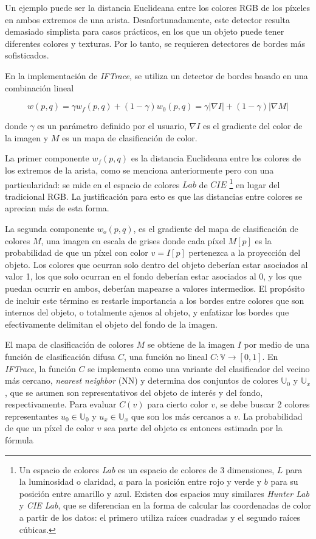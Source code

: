Un ejemplo puede ser la distancia Euclideana entre los colores RGB de los píxeles
en ambos extremos de una arista. Desafortunadamente, este detector resulta demasiado
simplista para casos prácticos, en los que un objeto puede tener diferentes colores y
texturas. Por lo tanto, se requieren detectores de bordes más sofisticados.

En la implementación de \textit{IFTrace}, se utiliza un detector de bordes basado en
una combinación lineal

\begin{equation}
   \label{eq:IFTrace-edge-detector}
   w(p,q) = \gamma w_{f}(p,q) + (1 - \gamma)w_{0}(p,q) = \gamma |\nabla I| + (1 - \gamma)|\nabla M|
\end{equation}

donde $\gamma$ es un parámetro definido por el usuario, $\nabla I$ es el gradiente
del color de la imagen y $M$ es un mapa de clasificación de color.

La primer componente $w_{f}(p,q)$ es la distancia Euclideana entre los colores
de los extremos de la arista, como se menciona anteriormente pero con una
particularidad: se mide en el espacio de colores $Lab$ de $CIE$ \footnote{ Un
  espacio de colores \textit{Lab} es un espacio de colores de 3 dimensiones,
  $L$ para la luminosidad o claridad, $a$ para la posición entre rojo y verde y
  $b$ para su posición entre amarillo y azul. Existen dos espacios muy similares
  \textit{Hunter Lab} y \textit{CIE Lab}, que se diferencian en la forma de
  calcular las coordenadas de color a partir de los datos: el primero utiliza
  raíces cuadradas y el segundo raíces cúbicas.} en lugar del tradicional RGB.
La justificación para esto es que las distancias entre colores se aprecian
más de esta forma.

La segunda componente $w_{o}(p,q)$, es el gradiente del mapa de clasificación
de colores $M$, una imagen en escala de grises donde cada píxel $M[p]$ es
la probabilidad de que un píxel con color $v=I[p]$ pertenezca a la proyección
del objeto. Los colores que ocurran solo dentro del objeto deberían estar
asociados al valor 1, los que solo ocurran en el fondo deberían estar
asociados al 0, y los que puedan ocurrir en ambos, deberían mapearse a
valores intermedios. El propósito de incluir este término es restarle
importancia a los bordes entre colores que son internos del objeto, o
totalmente ajenos al objeto, y enfatizar los bordes que efectivamente
delimitan el objeto del fondo de la imagen.

El mapa de clasificación de colores $M$ se obtiene de la imagen $I$ por medio de una
función de clasificación difusa $C$, una función no lineal $C : \mathbb{V} \to [0,1]$.
En \textit{IFTrace}, la función $C$ se implementa como una variante del clasificador
del vecino más cercano, \textit{nearest neighbor} (NN) y determina dos conjuntos de
colores $\mathbb{U}_{0}$ y $\mathbb{U}_{x}$, que se asumen son representativos del objeto de interés y del fondo, respectivamente.
Para evaluar $C(v)$ para
cierto color $v$, se debe buscar 2 colores representantes $u_{0} \in \mathbb{U}_{0}$
y $u_{x} \in \mathbb{U}_{x}$ que son los más cercanos a $v$.
La probabilidad de que un píxel de color $v$ sea parte del objeto es entonces estimada
por la fórmula

